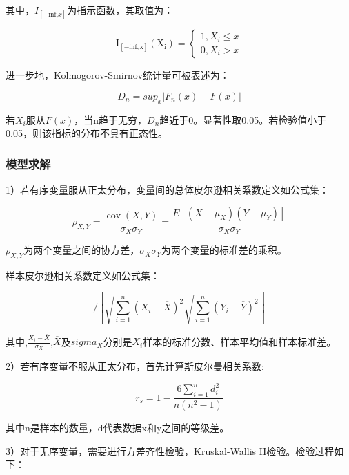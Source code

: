 \documentclass[bwprint]{gmcmthesis}
\begin{document}
\noindent 其中，$I_{[-\text{inf,}x]}$为指示函数，其取值为：

\begin{equation}
\left.\mathrm{I_{[-inf,x]}(X_i)}=\left\{\begin{matrix}1,X_i\leq x\\0,X_i>x\end{matrix}\right.\right.
\end{equation}

进一步地，Kolmogorov-Smirnov统计量可被表述为：

\begin{equation}
D_n=sup_x|F_n(x)-F(x)|
\end{equation}

\noindent 若$X_i$服从$F(x)$，当n趋于无穷，$D_n$趋近于0。显著性取0.05。若检验值小于0.05，则该指标的分布不具有正态性。

\subsubsection{模型求解}

1）若有序变量服从正太分布，变量间的总体皮尔逊相关系数定义如公式集：

\begin{equation}
\rho_{X,Y}=\frac{\operatorname{cov}\left(X,Y\right)}{\sigma_X\sigma_Y}=\frac{E[(X-\mu_X)(Y-\mu_Y)]}{\sigma_X\sigma_Y}
\end{equation}

$\rho_{X,Y}$为两个变量之间的协方差，$\sigma_X\sigma_Y$为两个变量的标准差的乘积。

样本皮尔逊相关系数定义如公式集：

\begin{equation}
[\sum_{i=1}^n(X_i-\overline{X})(Y_i-\overline{Y})]/[{\sqrt{\sum_{i=1}^n(X_i-\overline{X})^2}\sqrt{\sum_{i=1}^n(Y_i-\overline{Y})^2}}]
\end{equation}



\noindent 其中,$\frac{X_{i}-\overline{X}}{\sigma_{X}}$,$\overline{X}$及$sigma_X$分别是$X_i$样本的标准分数、样本平均值和样本标准差。

2）若有序变量不服从正太分布，首先计算斯皮尔曼相关系数:

\begin{equation}
r_s=1-\frac{6\sum_{i=1}^nd_i^2}{n(n^2-1)}
\end{equation}

\noindent 其中n是样本的数量，d代表数据x和y之间的等级差。

3）对于无序变量，需要进行方差齐性检验，Kruskal-Wallis H检验。检验过程如下：
\end{document}
